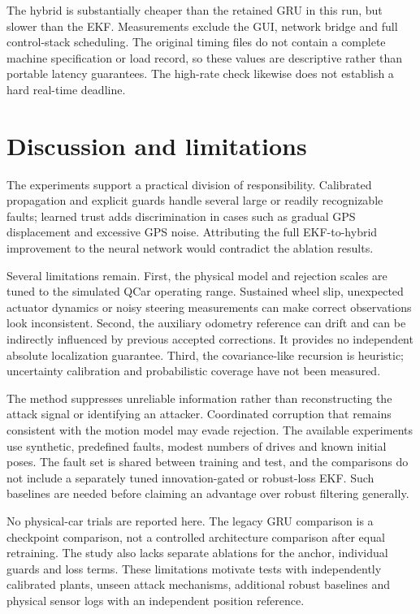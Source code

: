 ﻿\documentclass[10pt,a4paper]{article}
\begin{document}
\begin{table}[htbp]
\centering\small
\caption{Saved estimator-update timing in the nominal benchmark.}
\label{tab:runtime}

\end{table}

The hybrid is substantially cheaper than the retained GRU in this run, but slower than
the EKF. Measurements exclude the GUI, network bridge and full control-stack scheduling.
The original timing files do not contain a complete machine specification or load record,
so these values are descriptive rather than portable latency guarantees.
The high-rate check likewise does not establish a hard real-time deadline.

\section{Discussion and limitations}
The experiments support a practical division of responsibility. Calibrated propagation
and explicit guards handle several large or readily recognizable faults; learned trust
adds discrimination in cases such as gradual GPS displacement and excessive GPS noise.
Attributing the full EKF-to-hybrid improvement to the neural network would contradict
the ablation results.

Several limitations remain. First, the physical model and rejection scales are tuned to
the simulated QCar operating range. Sustained wheel slip, unexpected actuator dynamics or
noisy steering measurements can make correct observations look inconsistent.
Second, the auxiliary odometry reference can drift and can be indirectly influenced by
previous accepted corrections. It provides no independent absolute localization guarantee.
Third, the covariance-like recursion is heuristic; uncertainty calibration and probabilistic
coverage have not been measured.

The method suppresses unreliable information rather than reconstructing the attack
signal or identifying an attacker. Coordinated corruption that remains consistent with
the motion model may evade rejection. The available experiments use synthetic,
predefined faults, modest numbers of drives and known initial poses.
The fault set is shared between training and test, and the comparisons do not include a
separately tuned innovation-gated or robust-loss EKF. Such baselines are needed before
claiming an advantage over robust filtering generally.

No physical-car trials are reported here. The legacy GRU comparison is a checkpoint
comparison, not a controlled architecture comparison after equal retraining.
The study also lacks separate ablations for the anchor, individual guards and loss terms.
These limitations motivate tests with independently calibrated plants, unseen attack
mechanisms, additional robust baselines and physical sensor logs with an independent
position reference.
\end{document}

